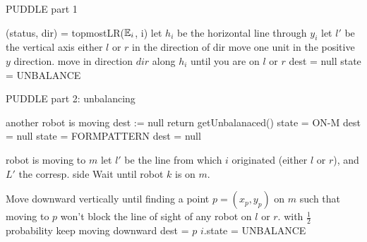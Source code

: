 \documentclass[preprint,10pt]{elsarticle}
\begin{document}
	\begin{algorithm}[H]
	\begin{algorithmic}[1]
	\caption{PUDDLE part 1}

					\State (status, dir) = topmostLR($\mathbb{E}_i$, i)
						\State let $h_i$ be the horizontal line through $y_i$
						\State let $l'$ be the vertical axis either $l$ or $r$ in the direction of dir
							\State move one unit in the positive $y$ direction.
						\EndIf
						\State move in direction $dir$ along $h_i$ until you are on $l$ or $r$
					\EndIf
				\Else
					\State dest = null
				\EndIf
					\State state = UNBALANCE
				\EndIf
			\EndCase
	\EndProcedure
	\end{algorithmic}
	\end{algorithm}

	\begin{algorithm}[H]
	\begin{algorithmic}[1]
	\caption{PUDDLE part 2: unbalancing}
		
			\State
				 \Comment another robot is moving
					\State dest := null
					\State return
				\EndIf
					\State getUnbalanaced()
					\State state = ON-M
					\State dest = null
				\Else
					\State state = FORMPATTERN
					\State dest = null
				\EndIf
			\EndCase

				\Comment robot is moving to $m$
					\State let $l'$ be the line from which $i$ originated (either $l$ or $r$), and $L'$ the corresp. side
						\State Wait until robot $k$ is on $m$.
					\EndWhile

					\State Move downward vertically until finding a point $p = (x_p, y_p)$ on $m$ such that 
						moving to $p$ won't block the line of sight of any robot on $l$ or $r$.
						\State with $\frac{1}{2}$ probability keep moving downward
					\EndWhile
						\State dest = $p$
						\State $i$.state = UNBALANCE
			\EndCase
			\State
	\EndProcedure
	\end{algorithmic}
	\end{algorithm}
\end{document}
